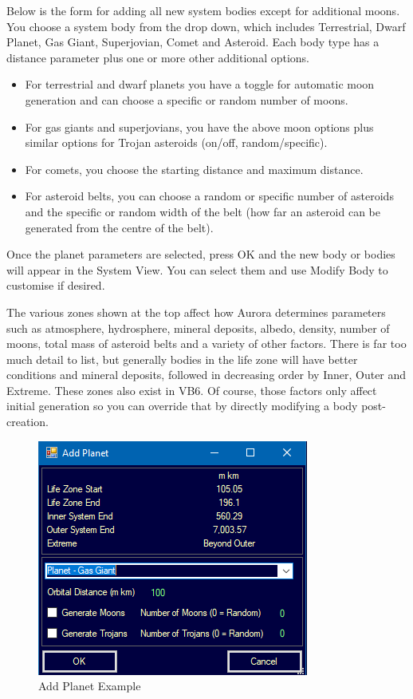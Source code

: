 \documentclass[../Aurora C# unofficial manual.tex]{subfiles}
\begin{document}
	Below is the form for adding all new system bodies except for additional moons. You choose a system body from the drop down, which includes Terrestrial, Dwarf Planet, Gas Giant, Superjovian, Comet and Asteroid. Each body type has a distance parameter plus one or more other additional options.
	\begin{itemize}
		\item For terrestrial and dwarf planets you have a toggle for automatic moon generation and can choose a specific or random number of moons.
		\item For gas giants and superjovians, you have the above moon options plus similar options for Trojan asteroids (on/off, random/specific).
		\item For comets, you choose the starting distance and maximum distance.
		\item For asteroid belts, you can choose a random or specific number of asteroids and the specific or random width of the belt (how far an asteroid can be generated from the centre of the belt).
	\end{itemize}
	
	Once the planet parameters are selected, press OK and the new body or bodies will appear in the System View. You can select them and use Modify Body to customise if desired.
	
	The various zones shown at the top affect how Aurora determines parameters such as atmosphere, hydrosphere, mineral deposits, albedo, density, number of moons, total mass of asteroid belts and a variety of other factors. There is far too much detail to list, but generally bodies in the life zone will have better conditions and mineral deposits, followed in decreasing order by Inner, Outer and Extreme. These zones also exist in VB6. Of course, those factors only affect initial generation so you can override that by directly modifying a body post-creation.
	\begin{figure}[H]
		\centering
		\includegraphics[width=0.5\linewidth]{images/AddPlanet}
		\caption[Add Planet Example]{Add Planet Example}
		\label{fig:addplanet}
	\end{figure}
	
\end{document}
